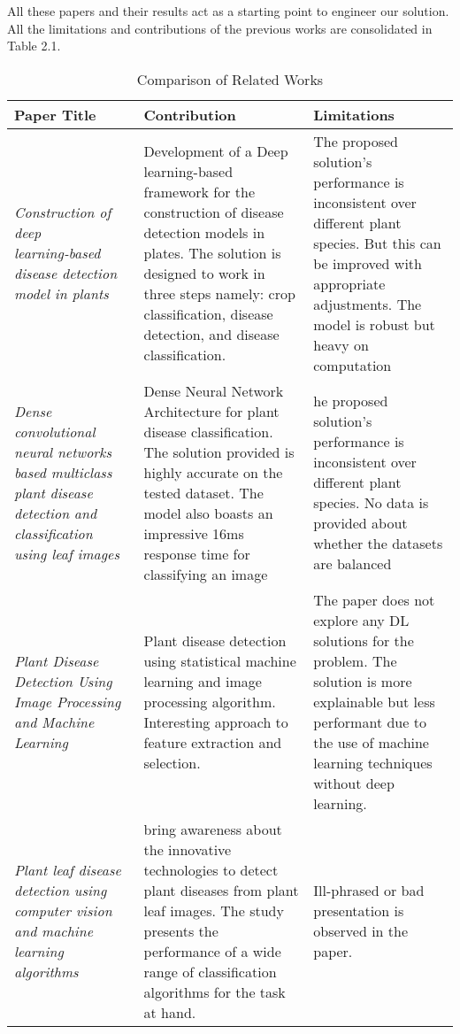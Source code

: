 All these papers and their results act as a starting point to engineer our solution. All the limitations and contributions of the previous works are consolidated in Table 2.1.

\begin{table}[h!]
    \centering
    \caption{Comparison of Related Works}
    \begin{tabular}{|p{5cm}|p{5cm}|p{5cm}|}
    \hline
    \textbf{Paper Title} & \textbf{Contribution} & \textbf{Limitations} \\ \hline
    \textit{Construction of deep learning‑based disease detection model in plants} & Development of a Deep learning-based framework for the construction of disease detection models in plates. The solution is designed to work in three steps namely: crop classification, disease detection, and disease classification. & The proposed solution's performance is inconsistent over different plant species. But this can be improved with appropriate adjustments. The model is robust but heavy on computation  \\ \hline

    \textit{Dense convolutional neural networks based multiclass plant disease detection and classification using leaf images} & Dense Neural Network Architecture for plant disease classification. The solution provided is highly accurate on the tested dataset. The model also boasts an impressive 16ms response time for classifying an image & he proposed solution’s performance is inconsistent over different plant species. 
    No data is provided about whether the datasets are balanced
      \\ \hline

      \textit{Plant Disease Detection Using Image Processing and Machine Learning} & Plant disease detection using statistical machine learning and image processing algorithm. Interesting approach to feature extraction and selection. & The paper does not explore any DL solutions for the problem. The solution is more explainable but less performant due to the use of machine learning techniques without deep learning.  \\ \hline


      \textit{Plant leaf disease detection using computer vision and machine learning algorithms} & bring awareness about the innovative technologies to detect plant diseases from plant leaf images. The study presents the performance of a wide range of classification algorithms for the task at hand. & Ill-phrased or bad presentation is observed in the paper. \\ \hline


\end{tabular}
\end{table}
